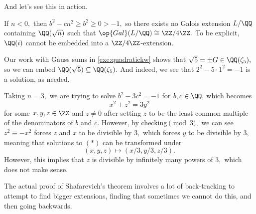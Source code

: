 And let's see this in action.
\begin{example}
	If $n<0,$ then $b^2-cn^2\ge b^2\ge0>-1,$ so there exists no Galois extension $L/\QQ$ containing $\QQ(\sqrt n)$ such that $\op{Gal}(L/\QQ)\cong\ZZ/4\ZZ.$ To be explicit, $\QQ(i)$ cannot be embedded into a $\ZZ/4\ZZ$-extension.
\end{example}
\begin{example}
	Our work with Gauss sums in \autoref{exe:quadratickw} shows that $\sqrt 5=\pm G\in\QQ(\zeta_5),$ so we can embed $\QQ(\sqrt 5)\subseteq\QQ(\zeta_5).$ And indeed, we see that $2^2-5\cdot1^2=-1$ is a solution, as needed.
\end{example}
\begin{example}
	Taking $n=3,$ we are trying to solve $b^2-3c^2=-1$ for $b,c\in\QQ,$ which becomes
	\[x^2+z^2=3y^2\tag{$*$}\]
	for some $x,y,z\in\ZZ$ and $z\ne0$ after setting $z$ to be the least common multiple of the denominators of $b$ and $c.$ However, by checking$\pmod3,$ we can see $z^2\equiv-x^2$ forces $z$ and $x$ to be divisible by $3,$ which forces $y$ to be divisible by $3,$ meaning that solutions to $(*)$ can be transformed under
	\[(x,y,z)\mapsto(x/3,y/3,z/3).\]
	However, this implies that $z$ is divisible by infinitely many powers of $3,$ which does not make sense.
\end{example}
\begin{remark}
	The actual proof of {Shafarevich}'s theorem involves a lot of back-tracking to attempt to find bigger extensions, finding that sometimes we cannot do this, and then going backwards.
\end{remark}

